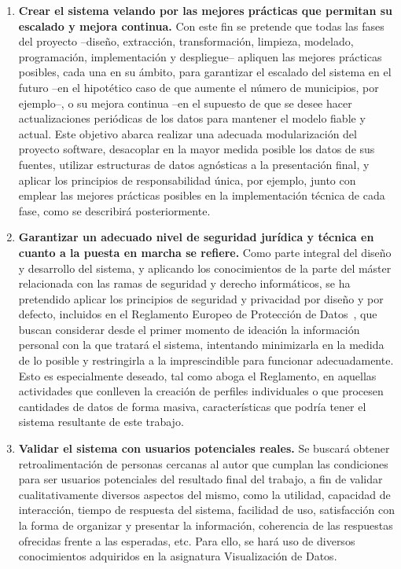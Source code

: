 \begin{enumerate}
    \item \textbf{Crear el sistema velando por las mejores prácticas que permitan su escalado y mejora continua.} Con este fin se pretende que todas las fases del proyecto –diseño, extracción, transformación, limpieza, modelado, programación, implementación y despliegue– apliquen las mejores prácticas posibles, cada una en su ámbito, para garantizar el escalado del sistema en el futuro –en el hipotético caso de que aumente el número de municipios, por ejemplo–, o su mejora continua –en el supuesto de que se desee hacer actualizaciones periódicas de los datos para mantener el modelo fiable y actual. Este objetivo abarca realizar una adecuada modularización del proyecto software, desacoplar en la mayor medida posible los datos de sus fuentes, utilizar estructuras de datos agnósticas a la presentación final, y aplicar los principios de responsabilidad única, por ejemplo, junto con emplear las mejores prácticas posibles en la implementación técnica de cada fase, como se describirá posteriormente.
    \item \textbf{Garantizar un adecuado nivel de seguridad jurídica y técnica en cuanto a la puesta en marcha se refiere.} Como parte integral del diseño y desarrollo del sistema, y aplicando los conocimientos de la parte del máster relacionada con las ramas de seguridad y derecho informáticos, se ha pretendido aplicar los principios de seguridad y privacidad por diseño y por defecto, incluidos en el Reglamento Europeo de Protección de Datos~\cite{aepd}, que buscan considerar desde el primer momento de ideación la información personal con la que tratará el sistema, intentando minimizarla en la medida de lo posible y restringirla a la imprescindible para funcionar adecuadamente. Esto es especialmente deseado, tal como aboga el Reglamento, en aquellas actividades que conlleven la creación de perfiles individuales o que procesen cantidades de datos de forma masiva, características que podría tener el sistema resultante de este trabajo.
    \item \textbf{Validar el sistema con usuarios potenciales reales.} Se buscará obtener retroalimentación de personas cercanas al autor que cumplan las condiciones para ser usuarios potenciales del resultado final del trabajo, a fin de validar cualitativamente diversos aspectos del mismo, como la utilidad, capacidad de interacción, tiempo de respuesta del sistema, facilidad de uso, satisfacción con la forma de organizar y presentar la información, coherencia de las respuestas ofrecidas frente a las esperadas, etc. Para ello, se hará uso de diversos conocimientos adquiridos en la asignatura \guillemotleft Visualización de Datos\guillemotright.
    
\end{enumerate}